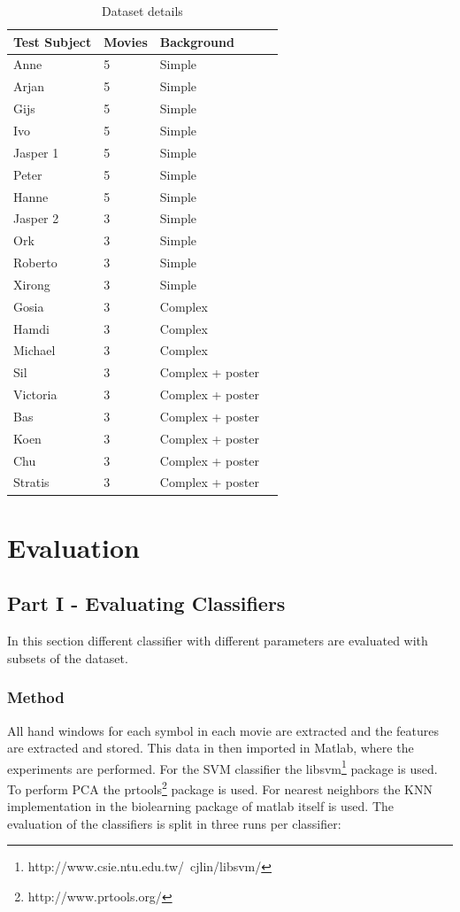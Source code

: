 \begin{table}
\centering
\begin{tabular}{llll}
\hline\hline
	Test Subject & Movies & Background &\\
\hline
	Anne     & 5 & Simple & \\
	Arjan    & 5 & Simple & \\
	Gijs     & 5 & Simple & \\
	Ivo      & 5 & Simple & \\
	Jasper 1 & 5 & Simple & \\
	Peter    & 5 & Simple & \\
	Hanne    & 5 & Simple & \\
	Jasper 2 & 3 & Simple & \\
	Ork      & 3 & Simple & \\
	Roberto  & 3 & Simple & \\
	Xirong   & 3 & Simple & \\
	Gosia    & 3 & Complex & \\
	Hamdi    & 3 & Complex & \\
	Michael  & 3 & Complex & \\
	Sil      & 3 & Complex + poster & \\
	Victoria & 3 & Complex + poster & \\
	Bas      & 3 & Complex + poster & \\
	Koen     & 3 & Complex + poster & \\
	Chu      & 3 & Complex + poster & \\
	Stratis  & 3 & Complex + poster & \\
\hline
\end{tabular}
\caption{Dataset details}
\end{table}

\section{Evaluation}

\subsection{Part I - Evaluating Classifiers}
In this section different classifier with different parameters are evaluated with subsets of the dataset.

\subsubsection{Method}
All hand windows for each symbol in each movie are extracted and the features are extracted and stored. This data in then imported in Matlab, where the experiments are performed. For the SVM classifier the libsvm\footnote{http://www.csie.ntu.edu.tw/~cjlin/libsvm/} package is used. To perform PCA the prtools\footnote{http://www.prtools.org/} package is used. For nearest neighbors the KNN implementation in the biolearning package of matlab itself is used. The evaluation of the classifiers is split in three runs per classifier:

